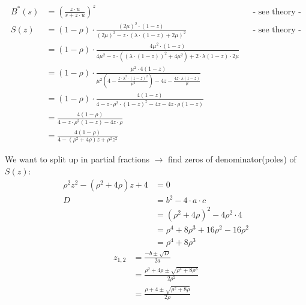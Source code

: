 \begin{align*}
B^{{\ast }}\left(s\right)&=\left(\frac{z\cdot u}{s+z\cdot u}\right)^{z}&& \text{-  see theory -}\\
S\left(z\right)&=\left(1-\rho \right)\cdot \frac{\left(2\mu \right)^{2}\cdot \left(1-z\right)}{\left(2\mu \right)^{2}-z\cdot \left(\lambda \cdot \left(1-z\right)+2\mu \right)^{2}}&& \text{-  see theory -}\\
&=\left(1-\rho \right)\cdot \frac{4\mu ^{2}\cdot \left(1-z\right)}{4\mu ^{2}-z\cdot \left(\left(\lambda \cdot \left(1-z\right)\right)^{2}+4\mu ^{2}\right)+2\cdot \lambda \left(1-z\right)\cdot 2\mu }\\
&=\left(1-\rho \right)\cdot \frac{\mu ^{2}\cdot 4\left(1-z\right)}{\mu ^{2}\left(4-\frac{z\cdot \lambda ^{2}\cdot \left(1-z\right)^{2}}{\mu ^{2}}\right)-4z-\frac{4z\cdot \lambda \left(1-z\right)}{\mu }}\\
&=\left(1-\rho \right)\cdot \frac{4\left(1-z\right)}{4-z\cdot \rho ^{2}\cdot \left(1-z\right)^{2}-4z-4z\cdot \rho \left(1-z\right)}\\
&=\frac{4\left(1-\rho \right)}{4-z\cdot \rho ^{2}\left(1-z\right)-4z\cdot \rho }\\
&=\frac{4\left(1-\rho \right)}{4-\left(\rho ^{2}+4\rho \right)z+\rho ^{2}z^{2}}
\end{align*}

We want to split up in partial fractions $\rightarrow$ find zeros of denominator(poles) of $S\left(z\right)$:
\begin{align*}
\rho ^{2}z^{2}-\left(\rho ^{2}+4\rho \right)z+4&=0\\
D&= b^2 - 4 \cdot a \cdot c\\
&=\left(\rho ^{2}+4\rho \right)^{2}-4\rho ^{2}\cdot 4\\
&=\rho ^{4}+8\rho ^{3}+16\rho ^{2}-16\rho ^{2}\\
&=\rho ^{4}+8\rho ^{3}
\end{align*}
\begin{align*}
z_{{1,2}}&=\frac{-b \pm \sqrt{D}}{2a}\\
&=\frac{\rho ^{2}+4\rho \pm \sqrt{\rho ^{4}+8\rho ^{3}}}{2\rho ^{2}}\\
&=\frac{\rho +4\pm \sqrt{\rho ^{2}+8\rho }}{2\rho }
\end{align*}

